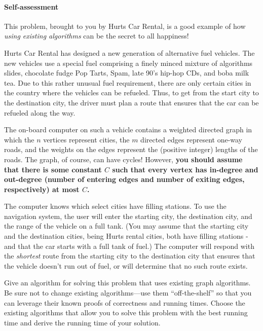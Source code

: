 \documentclass{ks-pset}
\begin{document}
\begin{solution}

  \paragraph{Self-assessment}
\end{solution}


\begin{problem}

  This problem, brought to you by Hurts Car Rental, is a good example of how
  \emph{using existing algorithms} can be the secret to all happiness!

  Hurts Car Rental has designed a new generation of alternative fuel vehicles.
  The new vehicles use a special fuel comprising a finely minced mixture of
  algorithms slides, chocolate fudge Pop Tarts, Spam, late 90's hip-hop CDs,
  and boba milk tea. Due to this rather unusual fuel requirement, there are
  only certain cities in the country where the vehicles can be refueled. Thus,
  to get from the start city to the destination city, the driver must plan a
  route that ensures that the car can be refueled along the way.

  The on-board computer on such a vehicle contains a weighted directed graph in
  which the \(n\) vertices represent cities, the \(m\) directed edges represent
  one-way roads, and the weights on the edges represent the (positive integer)
  lengths of the roads. The graph, of course, can have cycles! However,
  \textbf{you should assume that there is some constant \(C\) such that every
    vertex has in-degree and out-degree (number of entering edges and number of
  exiting edges, respectively) at most \(C\).}

  The computer knows which select cities have filling stations. To use the
  navigation system, the user will enter the starting city, the destination
  city, and the range of the vehicle on a full tank. (You may assume that the
  starting city and the destination cities, being Hurts rental cities, both
  have filling stations - and that the car starts with a full tank of fuel.)
  The computer will respond with the \emph{shortest} route from the starting
  city to the destination city that ensures that the vehicle doesn't run out of
  fuel, or will determine that no such route exists.

  \begin{subproblems}

    \item Give an algorithm for solving this problem that uses existing graph
      algorithms.  Be sure not to change existing algorithms---use them
      ``off-the-shelf'' so that you can leverage their known proofs of
      correctness and running times.  Choose the existing algorithms that allow
      you to solve this problem with the best running time and derive the
      running time of your solution.


\end{subproblems}
\end{problem}
\end{document}
